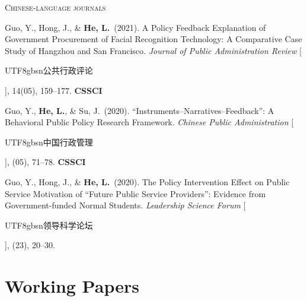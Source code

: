 \documentclass[11pt, a4paper]{article}
\begin{document}
\vspace{6pt}
\textsc{Chinese-language journals}
\vspace{4pt}
\begin{enumerate}[label={[\arabic*]}, resume]
    \item Guo, Y., Hong, J., \& \textbf{He, L.}\ (2021).
    A Policy Feedback Explanation of Government Procurement of Facial Recognition Technology:
    A Comparative Case Study of Hangzhou and San Francisco.
    \textit{Journal of Public Administration Review} [\begin{CJK}{UTF8}{gbsn}公共行政评论\end{CJK}], 14(05), 159--177.
    \hfill \textbf{CSSCI}

    \item Guo, Y., \textbf{He, L.}, \& Su, J.\ (2020).
    ``Instruments--Narratives--Feedback'':
    A Behavioral Public Policy Research Framework.
    \textit{Chinese Public Administration} [\begin{CJK}{UTF8}{gbsn}中国行政管理\end{CJK}], (05), 71--78.
    \hfill \textbf{CSSCI}

    \item Guo, Y., Hong, J., \& \textbf{He, L.}\ (2020).
    The Policy Intervention Effect on Public Service Motivation of ``Future Public Service Providers'':
    Evidence from Government-funded Normal Students.
    \textit{Leadership Science Forum} [\begin{CJK}{UTF8}{gbsn}领导科学论坛\end{CJK}], (23), 20--30.
\end{enumerate}

\section{Working Papers}
\end{document}
